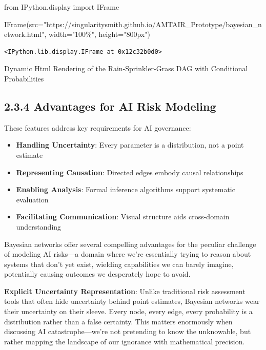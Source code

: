 \documentclass[
  11pt,
  letterpaper,
  openany]{book}
\newenvironment{Shaded}{\begin{snugshade}}{\end{snugshade}}
\newcommand{\ImportTok}[1]{\textcolor[rgb]{0.00,0.46,0.62}{#1}}
\newcommand{\NormalTok}[1]{\textcolor[rgb]{0.00,0.23,0.31}{#1}}
\newcommand{\OperatorTok}[1]{\textcolor[rgb]{0.37,0.37,0.37}{#1}}
\newcommand{\StringTok}[1]{\textcolor[rgb]{0.13,0.47,0.30}{#1}}
\providecommand{\tightlist}{%
  \setlength{\itemsep}{0pt}\setlength{\parskip}{0pt}}
\begin{document}
\begin{Shaded}
\begin{Highlighting}[]
\ImportTok{from}\NormalTok{ IPython.display }\ImportTok{import}\NormalTok{ IFrame}

\NormalTok{IFrame(src}\OperatorTok{=}\StringTok{"https://singularitysmith.github.io/AMTAIR\_Prototype/bayesian\_network.html"}\NormalTok{, width}\OperatorTok{=}\StringTok{"100\%"}\NormalTok{, height}\OperatorTok{=}\StringTok{"800px"}\NormalTok{)}
\end{Highlighting}
\end{Shaded}

\label{rain_sprinkler_grass_example_network_rendering}
\begin{verbatim}
<IPython.lib.display.IFrame at 0x12c32b0d0>
\end{verbatim}

Dynamic Html Rendering of the Rain-Sprinkler-Grass DAG with Conditional
Probabilities

\subsection{2.3.4 Advantages for AI Risk
Modeling}\label{sec-modeling-advantages}

These features address key requirements for AI governance:

\begin{itemize}
\tightlist
\item
  \textbf{Handling Uncertainty}: Every parameter is a distribution, not
  a point estimate
\item
  \textbf{Representing Causation}: Directed edges embody causal
  relationships
\item
  \textbf{Enabling Analysis}: Formal inference algorithms support
  systematic evaluation
\item
  \textbf{Facilitating Communication}: Visual structure aids
  cross-domain understanding
\end{itemize}

Bayesian networks offer several compelling advantages for the peculiar
challenge of modeling AI risks---a domain where we're essentially trying
to reason about systems that don't yet exist, wielding capabilities we
can barely imagine, potentially causing outcomes we desperately hope to
avoid.

\textbf{Explicit Uncertainty Representation}: Unlike traditional risk
assessment tools that often hide uncertainty behind point estimates,
Bayesian networks wear their uncertainty on their sleeve. Every node,
every edge, every probability is a distribution rather than a false
certainty. This matters enormously when discussing AI
catastrophe---we're not pretending to know the unknowable, but rather
mapping the landscape of our ignorance with mathematical precision.
\end{document}
